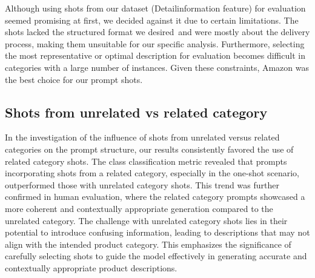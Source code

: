 \begin{center}
	\par
\end{center}



Although using shots from our dataset (Detailinformation feature) for evaluation seemed promising at first, we decided against it due to certain limitations. The shots lacked the structured format we desired and were mostly about the delivery process, making them unsuitable for our specific analysis. Furthermore, selecting the most representative or optimal description for evaluation becomes difficult in categories with a large number of instances. Given these constraints, Amazon was the best choice for our prompt shots. 



\subsection{Shots from unrelated vs related category}
In the investigation of the influence of shots from unrelated versus related categories on the prompt structure, our results consistently favored the use of related category shots. The class classification metric revealed that prompts incorporating shots from a related category, especially in the one-shot scenario, outperformed those with unrelated category shots. This trend was further confirmed in human evaluation, where the related category prompts showcased a more coherent and contextually appropriate generation compared to the unrelated category. The challenge with unrelated category shots lies in their potential to introduce confusing information, leading to descriptions that may not align with the intended product category. This emphasizes the significance of carefully selecting shots to guide the model effectively in generating accurate and contextually appropriate product descriptions.

